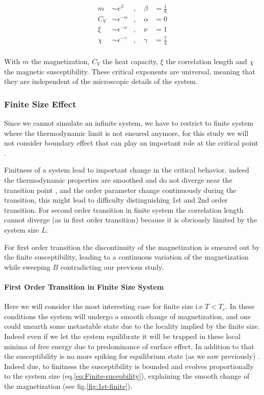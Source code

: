\documentclass[ansiapaper]{report}
\begin{document}
\begin{multicols}{3}
\begin{align*}
    m &\sim \epsilon^{\beta} &, \quad \beta &= \frac{1}{8} \\
    C_V &\sim \epsilon^{-\alpha} &, \quad  \alpha &= 0\\
    \xi &\sim \epsilon^{-\nu} &, \quad  \nu &= 1\\
    \chi &\sim \epsilon^{-\gamma} &, \quad  \gamma &= \frac{7}{4}\\ 
\end{align*}

With $m$ the magnetization, $C_V$ the heat capacity, $\xi$ the correlation length and $\chi$ the magnetic susceptibility. These critical exponents are universal, meaning that they are independent of the microscopic details of the system. 

\subsubsection{Finite Size Effect}
Since we cannot simulate an infinite system, we have to restrict to finite system where the thermodynamic limit is not ensured anymore, for this study we will not consider boundary effect that can play an important role at the critical point \cite{Landau}.

Finitness of a system lead to important change in the critical behavior, indeed the thermodynamic properties are smoothed and do not diverge near the transition point \cite{Landau}, and the order parameter change continuously during the transition,  this might lead to difficulty distinguishing 1st and  2nd order transition. For second order transition in finite system the correlation length cannot diverge (as in first order transition) because it is obviously limited by the system size $L$. 

For first order transition the discontinuity of the magnetization is smeared out by the finite susceptibility, leading to a continuous variation of the magnetization while sweeping $B$ contradicting our previous study. 

\paragraph*{First Order Transition in Finite Size System}
Here we will consider the most interesting case for finite size i.e $T< T_c$. In these conditions the system will undergo a smooth change of magnetization, and one could unearth some metastable state due to the locality implied by the finite size. Indeed even if we let the system equilibrate it will be trapped in these local minima of free energy due to predominance of surface effect. In addition to that the susceptibility is no more spiking for equilibrium state (as we saw previously) \cite{Susceptibility}. Indeed due, to finitness the susceptibility is bounded and evolves proportionally to the system size (eq.\ref{eq:Finite-sucepbility}), explaining the smooth change of the magnetization (see fig.\ref{fig:1st-finite}).  


\end{multicols}
\end{document}
